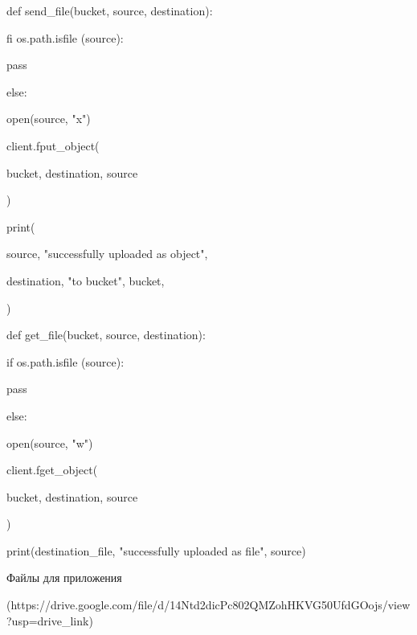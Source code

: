 \documentclass[a4paper,12pt]{article}
\begin{document}
\begin{description}
   \item def send\_file(bucket, source, destination):
        \item \hspace{10mm}  fi os.path.isfile (source):
        \item \hspace{15mm}   pass
        \item \hspace{10mm}   else:
        \item \hspace{15mm}  open(source, "x")
        \item \hspace{10mm}   client.fput\_object(
        \item \hspace{15mm}  bucket, destination, source
        \item \hspace{10mm}  )
        \item \hspace{10mm}  print(
        \item \hspace{15mm}  source, "successfully uploaded as object",
        \item \hspace{15mm}  destination, "to bucket", bucket,
        \item \hspace{10mm}  )
        \item \hspace{10mm}  def get\_file(bucket, source, destination):
        \item \hspace{15mm}  if os.path.isfile (source):
        \item \hspace{20mm}   pass

\newpage
        \item \hspace{15mm}    else:
        \item \hspace{10mm}   open(source, "w")
        \item \hspace{15mm}     client.fget\_object(
        \item \hspace{10mm}    bucket, destination, source
        \item \hspace{15mm}      )
        \item \hspace{15mm}     print(destination\_file, "successfully uploaded as file", source)
    \vspace{5mm}
    \item Файлы для приложения
    \item (https://drive.google.com/file/d/14Ntd2dicPc802QMZohHKVG50UfdGOojs/view?usp=drive\_link)
    \end{description}
\end{document}
